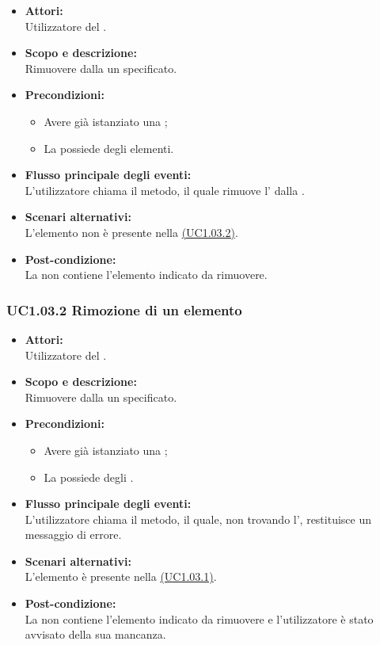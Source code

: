 \begin{itemize}
	\item \textbf{Attori:}
	\\Utilizzatore del .
	\item \textbf{Scopo e descrizione:} 
	\\Rimuovere dalla  un  specificato.
	\item \textbf{Precondizioni:}
	\begin{itemize}
		\item Avere già istanziato una ;
		\item La  possiede degli elementi.
	\end{itemize}
	\item \textbf{Flusso principale degli eventi:}
	\\L'utilizzatore chiama il metodo, il quale rimuove l' dalla .
	\item \textbf{Scenari alternativi:}
	\\L'elemento non è presente nella  \hyperref[UC1.03.2]{(UC1.03.2)}.
	\item \textbf{Post-condizione:}
	\\La {} non contiene l'elemento indicato da rimuovere.
\end{itemize}

\subsubsection{UC1.03.2 Rimozione di un elemento} \label{UC1.03.2}

\begin{itemize}
	\item \textbf{Attori:}
	\\Utilizzatore del .
	\item \textbf{Scopo e descrizione:} 
	\\Rimuovere dalla  un  specificato.
	\item \textbf{Precondizioni:}
	\begin{itemize}
		\item Avere già istanziato una ;
		\item La  possiede degli .
	\end{itemize}
	\item \textbf{Flusso principale degli eventi:}
	\\L'utilizzatore chiama il metodo, il quale, non trovando l', restituisce un messaggio di errore.
	\item \textbf{Scenari alternativi:}
	\\L'elemento è presente nella  \hyperref[UC1.03.1]{(UC1.03.1)}.
	\item \textbf{Post-condizione:}
	\\La {} non contiene l'elemento indicato da rimuovere e l'utilizzatore è stato avvisato della sua mancanza.
\end{itemize}

